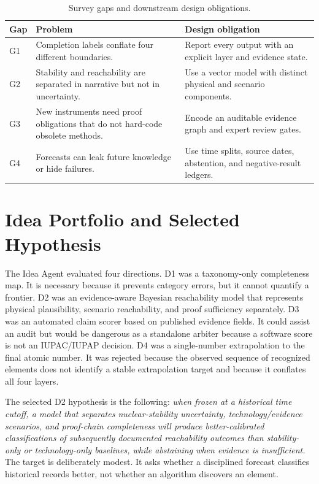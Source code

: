 \documentclass[conference]{IEEEtran}
\begin{document}
\begin{table}[!t]
\caption{Survey gaps and downstream design obligations.}
\label{tab:gaps}
\centering
\renewcommand{\arraystretch}{1.18}
\begin{tabular}{|P{0.11\columnwidth}|P{0.28\columnwidth}|P{0.34\columnwidth}|}
\hline
\textbf{Gap} & \textbf{Problem} & \textbf{Design obligation} \\
\hline
G1 & Completion labels conflate four different boundaries. & Report every output with an explicit layer and evidence state. \\
\hline
G2 & Stability and reachability are separated in narrative but not in uncertainty. & Use a vector model with distinct physical and scenario components. \\
\hline
G3 & New instruments need proof obligations that do not hard-code obsolete methods. & Encode an auditable evidence graph and expert review gates. \\
\hline
G4 & Forecasts can leak future knowledge or hide failures. & Use time splits, source dates, abstention, and negative-result ledgers. \\
\hline
\end{tabular}
\end{table}

\section{Idea Portfolio and Selected Hypothesis}

The Idea Agent evaluated four directions. D1 was a taxonomy-only completeness map. It is necessary because it prevents category errors, but it cannot quantify a frontier. D2 was an evidence-aware Bayesian reachability model that represents physical plausibility, scenario reachability, and proof sufficiency separately. D3 was an automated claim scorer based on published evidence fields. It could assist an audit but would be dangerous as a standalone arbiter because a software score is not an IUPAC/IUPAP decision. D4 was a single-number extrapolation to the final atomic number. It was rejected because the observed sequence of recognized elements does not identify a stable extrapolation target and because it conflates all four layers.

The selected D2 hypothesis is the following: \emph{when frozen at a historical time cutoff, a model that separates nuclear-stability uncertainty, technology/evidence scenarios, and proof-chain completeness will produce better-calibrated classifications of subsequently documented reachability outcomes than stability-only or technology-only baselines, while abstaining when evidence is insufficient.} The target is deliberately modest. It asks whether a disciplined forecast classifies historical records better, not whether an algorithm discovers an element.
\end{document}
